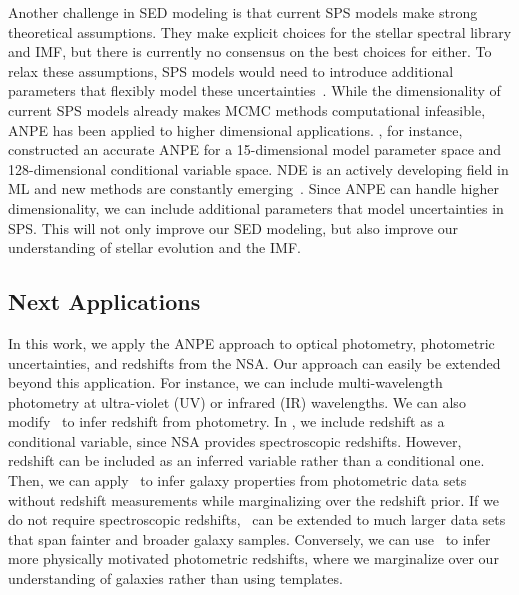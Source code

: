 Another challenge in SED modeling is that current SPS models make strong
theoretical assumptions.
They make explicit choices for the stellar spectral library and IMF, but there
is currently no consensus on the best choices for either.
To relax these assumptions, SPS models would need to introduce additional
parameters that flexibly model these uncertainties~\citep{conroy2009,
conroy2010c}. 
While the dimensionality of current SPS models already makes MCMC methods
computational infeasible, ANPE has been applied to higher dimensional
applications.
\cite{dax2021}, for instance, constructed an accurate ANPE for a
15-dimensional model parameter space and 128-dimensional conditional variable
space.
NDE is an actively developing field in ML and new methods are constantly
emerging~\citep[\eg][]{wu2020, dhariwal2021}. 
Since ANPE can handle higher dimensionality, we can include additional
parameters that model uncertainties in SPS. 
This will not only improve our SED modeling, but also improve our understanding
of stellar evolution and the IMF. 


\subsection{Next Applications} 
In this work, we apply the ANPE approach to optical photometry, photometric
uncertainties, and redshifts from the NSA. 
Our approach can easily be extended beyond this application. 
For instance, we can include multi-wavelength photometry at ultra-violet (UV)
or infrared (IR) wavelengths. 
We can also modify \sedflow~to infer redshift from photometry. 
In \sedflow, we include redshift as a conditional variable, since NSA provides
spectroscopic redshifts. 
However, redshift can be included as an inferred variable rather than a
conditional one. 
Then, we can apply \sedflow~to infer galaxy properties from photometric data
sets without redshift measurements while marginalizing over the redshift
prior. 
If we do not require spectroscopic redshifts, \sedflow~can be extended to much
larger data sets that span fainter and broader galaxy samples. 
Conversely, we can use \sedflow~to infer more physically motivated photometric 
redshifts, where we marginalize over our understanding of galaxies rather than
using templates. 

